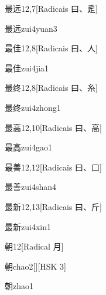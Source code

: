 \begin{entry}{最远}{12,7}[Radicais ⽈、⾡]
  \begin{phonetics}{最远}{zui4yuan3}
  \end{phonetics}
\end{entry}

\begin{entry}{最佳}{12,8}[Radicais ⽈、⼈]
  \begin{phonetics}{最佳}{zui4jia1}
  \end{phonetics}
\end{entry}

\begin{entry}{最终}{12,8}[Radicais ⽈、⽷]
  \begin{phonetics}{最终}{zui4zhong1}
  \end{phonetics}
\end{entry}

\begin{entry}{最高}{12,10}[Radicais ⽈、⾼]
  \begin{phonetics}{最高}{zui4gao1}
  \end{phonetics}
\end{entry}

\begin{entry}{最善}{12,12}[Radicais ⽈、⼝]
  \begin{phonetics}{最善}{zui4shan4}
  \end{phonetics}
\end{entry}

\begin{entry}{最新}{12,13}[Radicais ⽈、⽄]
  \begin{phonetics}{最新}{zui4xin1}
  \end{phonetics}
\end{entry}

\begin{entry}{朝}{12}[Radical ⽉]
  \begin{phonetics}{朝}{chao2}[][HSK 3]
  \end{phonetics}
  \begin{phonetics}{朝}{zhao1}
  \end{phonetics}
\end{entry}

